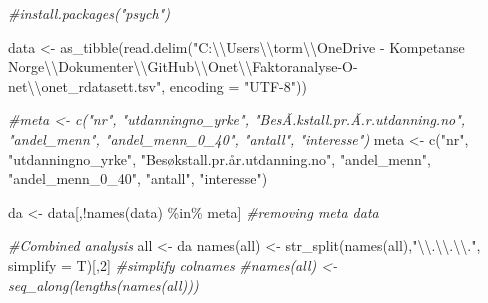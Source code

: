 \documentclass[
]{article}
\newenvironment{Shaded}{\begin{snugshade}}{\end{snugshade}}
\newcommand{\AttributeTok}[1]{\textcolor[rgb]{0.77,0.63,0.00}{#1}}
\newcommand{\CommentTok}[1]{\textcolor[rgb]{0.56,0.35,0.01}{\textit{#1}}}
\newcommand{\DecValTok}[1]{\textcolor[rgb]{0.00,0.00,0.81}{#1}}
\newcommand{\FunctionTok}[1]{\textcolor[rgb]{0.00,0.00,0.00}{#1}}
\newcommand{\NormalTok}[1]{#1}
\newcommand{\OtherTok}[1]{\textcolor[rgb]{0.56,0.35,0.01}{#1}}
\newcommand{\SpecialCharTok}[1]{\textcolor[rgb]{0.00,0.00,0.00}{#1}}
\newcommand{\StringTok}[1]{\textcolor[rgb]{0.31,0.60,0.02}{#1}}
\begin{document}
\begin{Shaded}
\begin{Highlighting}[]
\CommentTok{\#install.packages("psych")}



\NormalTok{data }\OtherTok{\textless{}{-}} \FunctionTok{as\_tibble}\NormalTok{(}\FunctionTok{read.delim}\NormalTok{(}\StringTok{"C:}\SpecialCharTok{\textbackslash{}\textbackslash{}}\StringTok{Users}\SpecialCharTok{\textbackslash{}\textbackslash{}}\StringTok{torm}\SpecialCharTok{\textbackslash{}\textbackslash{}}\StringTok{OneDrive {-} Kompetanse Norge}\SpecialCharTok{\textbackslash{}\textbackslash{}}\StringTok{Dokumenter}\SpecialCharTok{\textbackslash{}\textbackslash{}}\StringTok{GitHub}\SpecialCharTok{\textbackslash{}\textbackslash{}}\StringTok{Onet}\SpecialCharTok{\textbackslash{}\textbackslash{}}\StringTok{Faktoranalyse{-}O{-}net}\SpecialCharTok{\textbackslash{}\textbackslash{}}\StringTok{onet\_rdatasett.tsv"}\NormalTok{, }\AttributeTok{encoding =} \StringTok{"UTF{-}8"}\NormalTok{))}

\CommentTok{\#meta \textless{}{-} c("nr", "utdanningno\_yrke", "BesÃ.kstall.pr.Ã.r.utdanning.no", "andel\_menn", "andel\_menn\_0\_40", "antall", "interesse")    }
\NormalTok{meta }\OtherTok{\textless{}{-}} \FunctionTok{c}\NormalTok{(}\StringTok{"nr"}\NormalTok{, }\StringTok{"utdanningno\_yrke"}\NormalTok{, }\StringTok{"Besøkstall.pr.år.utdanning.no"}\NormalTok{, }\StringTok{"andel\_menn"}\NormalTok{, }\StringTok{"andel\_menn\_0\_40"}\NormalTok{, }\StringTok{"antall"}\NormalTok{, }\StringTok{"interesse"}\NormalTok{)    }


\NormalTok{da }\OtherTok{\textless{}{-}}\NormalTok{ data[,}\SpecialCharTok{!}\FunctionTok{names}\NormalTok{(data) }\SpecialCharTok{\%in\%}\NormalTok{ meta] }\CommentTok{\#removing meta data}

\CommentTok{\#Combined analysis}
\NormalTok{all }\OtherTok{\textless{}{-}}\NormalTok{ da}
\FunctionTok{names}\NormalTok{(all) }\OtherTok{\textless{}{-}} \FunctionTok{str\_split}\NormalTok{(}\FunctionTok{names}\NormalTok{(all),}\StringTok{"}\SpecialCharTok{\textbackslash{}\textbackslash{}}\StringTok{.}\SpecialCharTok{\textbackslash{}\textbackslash{}}\StringTok{.}\SpecialCharTok{\textbackslash{}\textbackslash{}}\StringTok{."}\NormalTok{, }\AttributeTok{simplify =}\NormalTok{ T)[,}\DecValTok{2}\NormalTok{] }\CommentTok{\#simplify colnames}
\CommentTok{\#names(all) \textless{}{-} seq\_along(lengths(names(all)))}
\end{Highlighting}
\end{Shaded}
\end{document}

